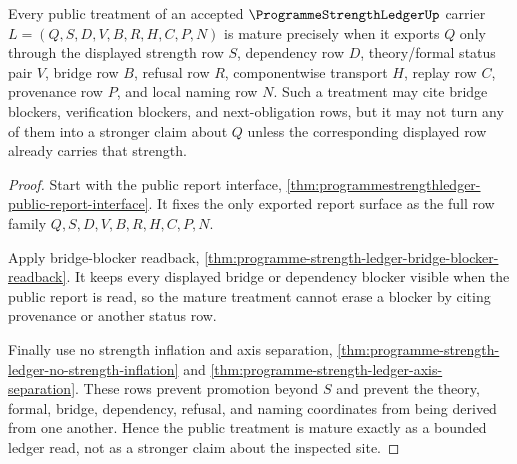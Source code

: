 \begin{theorem}
\label{thm:programme-strength-ledger-mature-treatment}
Every public treatment of an accepted $\ProgrammeStrengthLedgerUp$ carrier
$L=(Q,S,D,V,B,R,H,C,P,N)$ is mature precisely when it exports $Q$ only through
the displayed strength row $S$, dependency row $D$, theory/formal status pair
$V$, bridge row $B$, refusal row $R$, componentwise transport $H$, replay row
$C$, provenance row $P$, and local naming row $N$. Such a treatment may cite
bridge blockers, verification blockers, and next-obligation rows, but it may
not turn any of them into a stronger claim about $Q$ unless the corresponding
displayed row already carries that strength.
\end{theorem}
\begin{proof}
Start with the public report interface,
\autoref{thm:programmestrengthledger-public-report-interface}. It fixes the
only exported report surface as the full row family $Q,S,D,V,B,R,H,C,P,N$.

Apply bridge-blocker readback,
\autoref{thm:programme-strength-ledger-bridge-blocker-readback}. It keeps every
displayed bridge or dependency blocker visible when the public report is read,
so the mature treatment cannot erase a blocker by citing provenance or another
status row.

Finally use no strength inflation and axis separation,
\autoref{thm:programme-strength-ledger-no-strength-inflation} and
\autoref{thm:programme-strength-ledger-axis-separation}. These rows prevent
promotion beyond $S$ and prevent the theory, formal, bridge, dependency,
refusal, and naming coordinates from being derived from one another. Hence the
public treatment is mature exactly as a bounded ledger read, not as a stronger
claim about the inspected site.
\end{proof}

